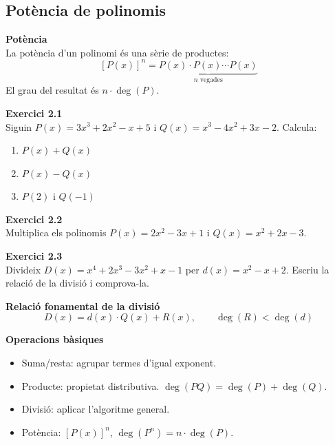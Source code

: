 \documentclass[12pt]{article}
\begin{document}
\subsection{Potència de polinomis}

\begin{concept}
\textbf{Potència}\\
La potència d'un polinomi és una sèrie de productes:
\[
[P(x)]^n = \underbrace{P(x) \cdot P(x) \cdots P(x)}_{n \text{ vegades}}
\]
El grau del resultat és $n \cdot \deg(P)$.
\end{concept}

\begin{exercici}
\textbf{Exercici 2.1}\\
Siguin $P(x) = 3x^3+2x^2-x+5$ i $Q(x) = x^3-4x^2+3x-2$. Calcula:
\begin{enumerate}[label=\alph*)]
    \item $P(x) + Q(x)$
    \item $P(x) - Q(x)$
    \item $P(2)$ i $Q(-1)$
\end{enumerate}
\end{exercici}

\begin{exercici}
\textbf{Exercici 2.2}\\
Multiplica els polinomis $P(x) = 2x^2-3x+1$ i $Q(x) = x^2+2x-3$.
\end{exercici}

\begin{exercici}
\textbf{Exercici 2.3}\\
Divideix $D(x) = x^4+2x^3-3x^2+x-1$ per $d(x) = x^2-x+2$. Escriu la relació de la divisió i comprova-la.
\end{exercici}

\begin{resum}[title=Resum 2: Polinomis]
\textbf{Relació fonamental de la divisió}
\[
D(x) = d(x) \cdot Q(x) + R(x), \qquad \deg(R) < \deg(d)
\]

\textbf{Operacions bàsiques}
\begin{itemize}
    \item Suma/resta: agrupar termes d'igual exponent.
    \item Producte: propietat distributiva. $\deg(PQ) = \deg(P) + \deg(Q)$.
    \item Divisió: aplicar l'algoritme general.
    \item Potència: $[P(x)]^n$, $\deg(P^n) = n \cdot \deg(P)$.
\end{itemize}
\end{resum}
\end{document}
